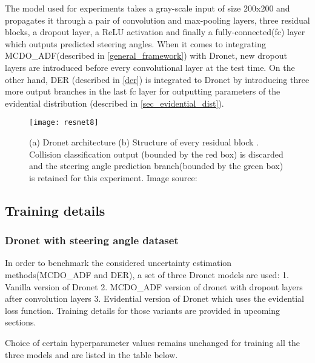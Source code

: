 The model used for experiments takes a gray-scale input of size 200x200 and propagates it through a pair of convolution and max-pooling layers, three residual blocks, a dropout layer, a ReLU activation and finally a fully-connected(fc) layer which outputs predicted steering angles. When it comes to integrating MCDO\_ADF(described in \ref{general_framework}) with Dronet, new dropout layers are introduced before every convolutional layer at the test time. On the other hand, DER (described in \ref{der}) is integrated to Dronet by introducing three more output branches in the last fc layer for outputting parameters of the evidential distribution (described in \ref{sec_evidential_dist}).
\begin{figure}
	\texttt{[image: resnet8]}
	\caption{(a) Dronet architecture (b) Structure of every residual block . Collision classification output (bounded by the red box) is discarded and the steering angle prediction branch(bounded by the green box) is retained for this experiment.  Image source: }
	\label{fig_resnet8}
\end{figure}
 
\subsection{Training details}
\subsubsection{Dronet with steering angle dataset}
In order to benchmark the considered uncertainty estimation methods(MCDO\_ADF and DER), a set of three Dronet models are used: 1. Vanilla version of Dronet 2. MCDO\_ADF version of dronet with dropout layers after convolution layers 3. Evidential version of Dronet which uses the evidential loss function. Training details for those variants are provided in upcoming sections.

Choice of certain hyperparameter values remains unchanged for training all the three models and are listed in the table below.

